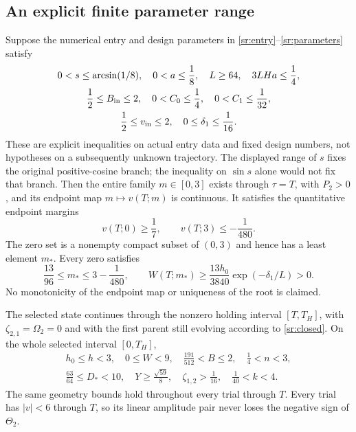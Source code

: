 \subsection{An explicit finite parameter range}

\begin{theorem}\label{sr:theorem}
Suppose the numerical entry and design parameters in
\eqref{sr:entry}--\eqref{sr:parameters} satisfy
\begin{equation}\label{sr:box}
 \begin{gathered}
 0<s\leq\arcsin(1/8),\quad 0<a\leq\frac18,\quad
 L\geq64,\quad 3LHa\leq\frac14,\\
 \frac12\leq B_{\rm in}\leq2,\quad
 0<C_0\leq\frac14,\quad 0<C_1\leq\frac1{32},\\
 \frac12\leq v_{\rm in}\leq2,\quad 0\leq\delta_1\leq\frac1{16}.
 \end{gathered}
\end{equation}
These are explicit inequalities on actual entry data and fixed design
numbers, not hypotheses on a subsequently unknown trajectory.
The displayed range of $s$ fixes the original positive-cosine branch;
the inequality on $\sin s$ alone would not fix that branch.
Then the entire family $m\in[0,3]$ exists through $\tau=T$,
with $P_2>0$, and its endpoint map $m\mapsto v(T;m)$ is continuous.
It satisfies the quantitative endpoint margins
\begin{equation}\label{sr:margins}
 v(T;0)\geq\frac17,\qquad v(T;3)\leq-\frac1{480}.
\end{equation}
The zero set is a nonempty compact subset of $(0,3)$ and hence
has a least element $m_*$. Every zero satisfies
\begin{equation}\label{sr:rootbounds}
 \frac{13}{96}\leq m_*\leq3-\frac1{480},\qquad
 W(T;m_*)\geq \frac{13h_0}{3840}
                     \exp(-\delta_1/L)>0.
\end{equation}
No monotonicity of the endpoint map or uniqueness of the root is claimed.

The selected state continues through the nonzero holding interval
$[T,T_H]$, with $\zeta_{2,1}=\Omega_2=0$ and with the first parent
still evolving according to \eqref{sr:closed}. On the whole selected
interval $[0,T_H]$,
\begin{equation}\label{sr:geom-bounds}
 \begin{gathered}
 h_0\leq h<3,\quad 0\leq W<9,\quad
 \frac{191}{512}<B\leq2,\quad
 \frac14<n<3,\\
 \frac{63}{64}\leq D_*<10,\quad
 Y\geq\frac{\sqrt{59}}8,\quad
 \zeta_{1,2}>\frac1{16},\quad
 \frac1{40}<k<4.
 \end{gathered}
\end{equation}
The same geometry bounds hold throughout every trial through $T$.
Every trial has $|v|<6$ through $T$, so its linear amplitude pair
never loses the negative sign of $\Theta_2$.


\end{theorem}
